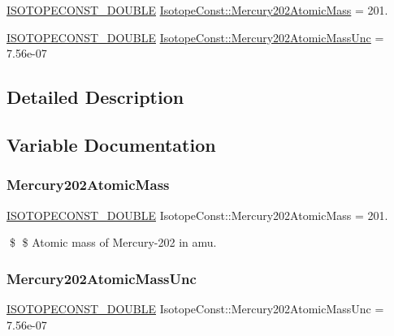 \begin{DoxyCompactItemize}
\item 
\mbox{\hyperlink{group___isotope_const-_macros_ga8f45a7272ce02c0b4c65c44636ed719a}{I\+S\+O\+T\+O\+P\+E\+C\+O\+N\+S\+T\+\_\+\+D\+O\+U\+B\+LE}} \mbox{\hyperlink{group___isotope_const-_mercury-_hg202_ga4cd07a13c73bfd052f203baec2abf85d}{Isotope\+Const\+::\+Mercury202\+Atomic\+Mass}} = 201.
\item 
\mbox{\hyperlink{group___isotope_const-_macros_ga8f45a7272ce02c0b4c65c44636ed719a}{I\+S\+O\+T\+O\+P\+E\+C\+O\+N\+S\+T\+\_\+\+D\+O\+U\+B\+LE}} \mbox{\hyperlink{group___isotope_const-_mercury-_hg202_ga130a4a6bc78474cebe466250863a2eef}{Isotope\+Const\+::\+Mercury202\+Atomic\+Mass\+Unc}} = 7.\+56e-\/07
\end{DoxyCompactItemize}


\subsection{Detailed Description}


\subsection{Variable Documentation}
\mbox{\label{group___isotope_const-_mercury-_hg202_ga4cd07a13c73bfd052f203baec2abf85d}} 
\subsubsection{\texorpdfstring{Mercury202\+Atomic\+Mass}{Mercury202AtomicMass}}
{\footnotesize\ttfamily \mbox{\hyperlink{group___isotope_const-_macros_ga8f45a7272ce02c0b4c65c44636ed719a}{I\+S\+O\+T\+O\+P\+E\+C\+O\+N\+S\+T\+\_\+\+D\+O\+U\+B\+LE}} Isotope\+Const\+::\+Mercury202\+Atomic\+Mass = 201.}

\$ \$ Atomic mass of Mercury-\/202 in amu. \mbox{\label{group___isotope_const-_mercury-_hg202_ga130a4a6bc78474cebe466250863a2eef}} 
\subsubsection{\texorpdfstring{Mercury202\+Atomic\+Mass\+Unc}{Mercury202AtomicMassUnc}}
{\footnotesize\ttfamily \mbox{\hyperlink{group___isotope_const-_macros_ga8f45a7272ce02c0b4c65c44636ed719a}{I\+S\+O\+T\+O\+P\+E\+C\+O\+N\+S\+T\+\_\+\+D\+O\+U\+B\+LE}} Isotope\+Const\+::\+Mercury202\+Atomic\+Mass\+Unc = 7.\+56e-\/07}

